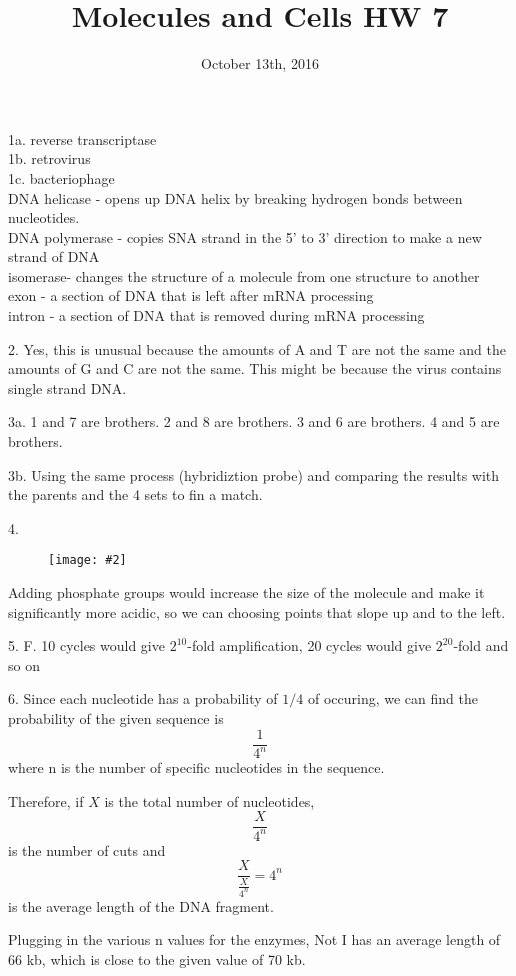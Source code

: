\documentclass{article}
\title{Molecules and Cells HW 7}
\date{October 13th, 2016}
\newcommand{\makefig}[2]{
\begin{figure}[h]
\centering
\texttt{[image: \#2]}
\end{figure}
}
\begin{document}
\maketitle

1a. reverse transcriptase\\
1b. retrovirus\\
1c. bacteriophage\\
DNA helicase - opens up DNA helix by breaking hydrogen bonds between nucleotides.\\
DNA polymerase - copies SNA strand in the 5' to 3' direction to make a new strand of DNA\\
isomerase- changes the structure of a molecule from one structure to another\\
exon - a section of DNA that is left after mRNA processing\\
intron - a section of DNA that is removed during mRNA processing\vspace{2mm}

2. Yes, this is unusual because the amounts of A and T are not the same and the amounts of G and C are not the same. This might be because the virus contains single strand DNA.
\vspace{2mm}

3a. 1 and 7 are brothers. 2 and 8 are brothers. 3 and 6 are brothers. 4 and 5 are brothers.
 
3b. Using the same process (hybridiztion probe) and comparing the results with the parents and the 4 sets to fin a match.
\vspace{2mm}

4. \makefig{0.5}{P4.png}
Adding phosphate groups would increase the size of the molecule and make it significantly more acidic, so we can choosing points that slope up and to the left. 
\vspace{2mm}

5. F. 10 cycles would give $2^{10}$-fold amplification, 20 cycles would give $2^{20}$-fold and so on
\vspace{2mm}

6. Since each nucleotide has a probability of $1/4$ of occuring, we can find the probability of the given sequence is
$$\frac{1}{4^n}$$
where n is the number of specific nucleotides in the sequence.

Therefore, if $X$ is the total number of nucleotides,
$$\frac{X}{4^n}$$
is the number of cuts and
$$\frac{X}{\frac{X}{4^n}}=4^n$$
is the average length of the DNA fragment.

Plugging in the various n values for the enzymes, Not I has an average length of 66 kb, which is close to the given value of 70 kb.
\end{document}
